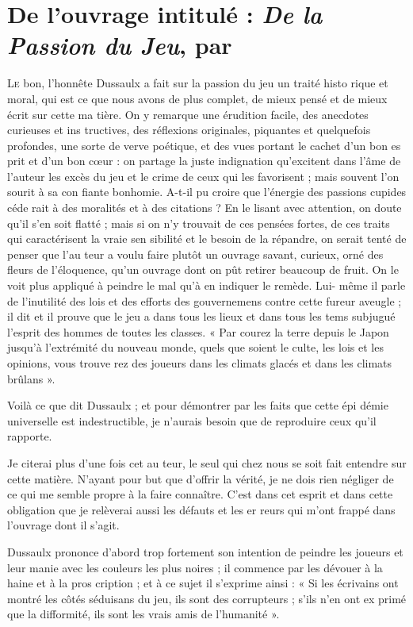 \chapter{
  De l'ouvrage intitulé : \emph{De la Passion
  du Jeu}, par 
}

\lettrine{L}{e} bon, l'honnête Dussaulx a fait
sur la passion du jeu un traité histo%
rique et moral, qui est ce que nous
avons de plus complet, de mieux
pensé et de mieux écrit sur cette ma%
tière. On y remarque une érudition
facile, des anecdotes curieuses et ins%
tructives, des réflexions originales,
piquantes et quelquefois profondes,
une sorte de verve poétique, et des
vues portant le cachet d'un bon es%
prit et d'un bon cœur : on partage
la juste indignation qu'excitent dans
l'âme de l'auteur les excès du jeu et
le crime de ceux qui les favorisent ;
mais souvent l'on sourit à sa con%
fiante bonhomie. A-t-il pu croire que
l'énergie des passions cupides céde%
rait à des moralités et à des citations ?
En le lisant avec attention, on doute
qu'il s'en soit flatté ; mais si on n'y
trouvait de ces pensées fortes, de ces
traits qui caractérisent la vraie sen%
sibilité et le besoin de la répandre,
on serait tenté de penser que l'au%
teur a voulu faire plutôt un ouvrage
savant, curieux, orné des fleurs de
l'éloquence, qu'un ouvrage dont on
pût retirer beaucoup de fruit. On le
voit plus appliqué à peindre le mal
qu'à en indiquer le remède. Lui-%
même il parle de l'inutilité des lois et
des efforts des gouvernemens contre
cette fureur aveugle ; il dit et il prouve
que le jeu a dans tous les lieux et dans
tous les tems subjugué l'esprit des
hommes de toutes les classes. « Par%
courez la terre depuis le Japon
jusqu'à l'extrémité du nouveau
monde, quels que soient le culte,
les lois et les opinions, vous trouve%
rez des joueurs dans les climats
glacés et dans les climats brûlans ».

Voilà ce que  dit Dussaulx ; et pour
démontrer par les faits que cette épi%
démie universelle est indestructible,
je n'aurais besoin que de reproduire
ceux qu'il rapporte.

Je citerai plus d'une fois cet au%
teur, le seul qui chez nous se soit fait
entendre sur cette matière. N'ayant
pour but que d'offrir la vérité, je ne
dois rien négliger de ce qui me semble
propre à la faire connaître. C'est dans
cet esprit et dans cette obligation que
je relèverai aussi les défauts et les er%
reurs qui m'ont frappé dans l'ouvrage
dont il s'agit.

Dussaulx prononce d'abord trop
fortement son intention de peindre
les joueurs et leur manie avec les
couleurs les plus noires ; il commence
par les dévouer à la haine et à la pros%
cription ; et à ce sujet il s'exprime
ainsi : « Si les écrivains ont montré
les côtés séduisans du jeu, ils sont
des corrupteurs ; s'ils n'en ont ex%
primé que la difformité, ils sont
les vrais amis de l'humanité ».

